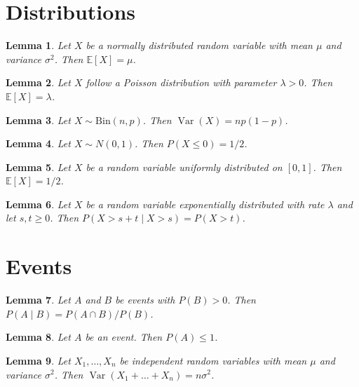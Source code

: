 \documentclass{article}
\newtheorem{lemma}{Lemma}
\begin{document}
\section{Distributions}

\begin{lemma}\label{normal-mean}
Let $X$ be a normally distributed random variable with mean $\mu$ and variance $\sigma^2$. Then $\mathbb{E}[X]=\mu$.
\end{lemma}

\begin{lemma}\label{poisson-mean}
Let $X$ follow a Poisson distribution with parameter $\lambda>0$. Then $\mathbb{E}[X]=\lambda$.
\end{lemma}

\begin{lemma}\label{binomial-variance}
Let $X\sim \mathrm{Bin}(n,p)$. Then $\operatorname{Var}(X)=np(1-p)$.
\end{lemma}

\begin{lemma}\label{standard-normal}
Let $X\sim N(0,1)$. Then $P(X\le 0)=1/2$.
\end{lemma}

\begin{lemma}\label{uniform-mean}
Let $X$ be a random variable uniformly distributed on $[0,1]$. Then $\mathbb{E}[X]=1/2$.
\end{lemma}

\begin{lemma}\label{exponential-memoryless}
Let $X$ be a random variable exponentially distributed with rate $\lambda$ and let $s,t\ge0$. Then $P(X>s+t\mid X>s)=P(X>t)$.
\end{lemma}

\section{Events}

\begin{lemma}\label{conditional}
Let $A$ and $B$ be events with $P(B)>0$. Then $P(A\mid B)=P(A\cap B)/P(B)$.
\end{lemma}

\begin{lemma}\label{complement}
Let $A$ be an event. Then $P(A)\le1$.
\end{lemma}

\begin{lemma}\label{variance-of-sum}
Let $X_1,\dots,X_n$ be independent random variables with mean $\mu$ and variance $\sigma^2$. Then $\operatorname{Var}(X_1+\dots+X_n)=n\sigma^2$.
\end{lemma}
\end{document}
